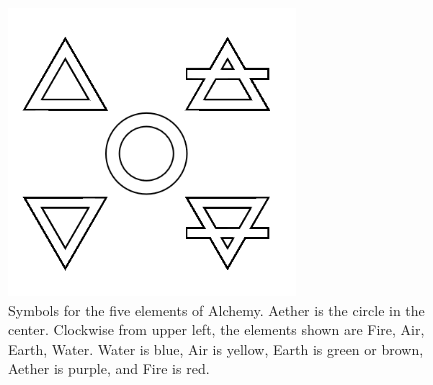 \begin{figure}
	\centering
	\includegraphics[width=3in]{figures/magic/alchemy.png}
	\caption[alchemy]
	{Symbols for the five elements of Alchemy.  Aether is the circle in the center.  Clockwise from upper left, the elements shown are Fire, Air, Earth, Water.  Water is blue, Air is yellow, Earth is green or brown, Aether is purple, and Fire is red.}
\end{figure}

